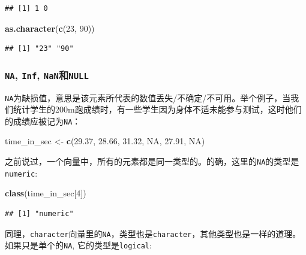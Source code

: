 \documentclass[]{book}
\newenvironment{Shaded}{\begin{snugshade}}{\end{snugshade}}
\newcommand{\DecValTok}[1]{\textcolor[rgb]{0.00,0.00,0.81}{#1}}
\newcommand{\FloatTok}[1]{\textcolor[rgb]{0.00,0.00,0.81}{#1}}
\newcommand{\KeywordTok}[1]{\textcolor[rgb]{0.13,0.29,0.53}{\textbf{#1}}}
\newcommand{\NormalTok}[1]{#1}
\newcommand{\OtherTok}[1]{\textcolor[rgb]{0.56,0.35,0.01}{#1}}
\newcommand{\StringTok}[1]{\textcolor[rgb]{0.31,0.60,0.02}{#1}}
\begin{document}
\begin{verbatim}
## [1] 1 0
\end{verbatim}

\begin{Shaded}
\begin{Highlighting}[]
\KeywordTok{as.character}\NormalTok{(}\KeywordTok{c}\NormalTok{(}\DecValTok{23}\NormalTok{, }\DecValTok{90}\NormalTok{))}
\end{Highlighting}
\end{Shaded}

\begin{verbatim}
## [1] "23" "90"
\end{verbatim}

\hypertarget{na-inf-nan-null}{%
\subsubsection{\texorpdfstring{\texttt{NA}, \texttt{Inf}, \texttt{NaN}和\texttt{NULL}}{NA, Inf, NaN和NULL}}\label{na-inf-nan-null}}

\texttt{NA}为缺损值，意思是该元素所代表的数值丢失/不确定/不可用。举个例子，当我们统计学生的200m跑成绩时，有一些学生因为身体不适未能参与测试，这时他们的成绩应被记为\texttt{NA}：

\begin{Shaded}
\begin{Highlighting}[]
\NormalTok{time_in_sec <-}\StringTok{ }\KeywordTok{c}\NormalTok{(}\FloatTok{29.37}\NormalTok{, }\FloatTok{28.66}\NormalTok{, }\FloatTok{31.32}\NormalTok{, }\OtherTok{NA}\NormalTok{, }\FloatTok{27.91}\NormalTok{, }\OtherTok{NA}\NormalTok{)}
\end{Highlighting}
\end{Shaded}

之前说过，一个向量中，所有的元素都是同一类型的。的确，这里的\texttt{NA}的类型是\texttt{numeric}:

\begin{Shaded}
\begin{Highlighting}[]
\KeywordTok{class}\NormalTok{(time_in_sec[}\DecValTok{4}\NormalTok{])}
\end{Highlighting}
\end{Shaded}

\begin{verbatim}
## [1] "numeric"
\end{verbatim}

同理，\texttt{character}向量里的\texttt{NA}，类型也是\texttt{character}，其他类型也是一样的道理。如果只是单个的\texttt{NA}, 它的类型是\texttt{logical}:
\end{document}
